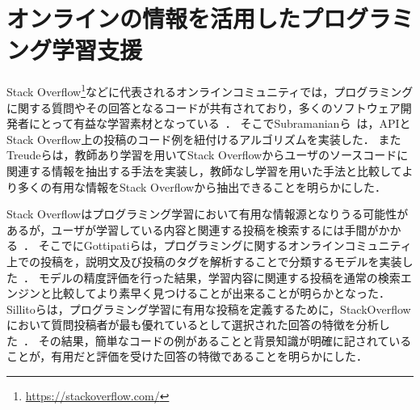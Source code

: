 


\section{オンラインの情報を活用したプログラミング学習支援}


%
%

Stack Overflow\footnote{\url{https://stackoverflow.com/}}などに代表されるオンラインコミュニティでは，プログラミングに関する質問やその回答となるコードが共有されており，多くのソフトウェア開発者にとって有益な学習素材となっている~\cite{Mamykina_Design_SO}．
そこでSubramanianら~\cite{Live_in_Documentation}は，APIとStack Overflow上の投稿のコード例を紐付けるアルゴリズムを実装した．
またTreudeら\cite{Augmenting_API_Documentation}は，教師あり学習を用いてStack Overflowからユーザのソースコードに関連する情報を抽出する手法を実装し，教師なし学習を用いた手法と比較してより多くの有用な情報をStack Overflowから抽出できることを明らかにした．

Stack Overflowはプログラミング学習において有用な情報源となりうる可能性があるが，ユーザが学習している内容と関連する投稿を検索するには手間がかかる~\cite{study_SO}．
そこでにGottipatiらは，プログラミングに関するオンラインコミュニティ上での投稿を，説明文及び投稿のタグを解析することで分類するモデルを実装した~\cite{Gottipati_finding_resource}．
モデルの精度評価を行った結果，学習内容に関連する投稿を通常の検索エンジンと比較してより素早く見つけることが出来ることが明らかとなった．
Sillitoらは，プログラミング学習に有用な投稿を定義するために，StackOverflowにおいて質問投稿者が最も優れているとして選択された回答の特徴を分析した~\cite{StackOverflowCodeExample}．
その結果，簡単なコードの例があることと背景知識が明確に記されていることが，有用だと評価を受けた回答の特徴であることを明らかにした．



